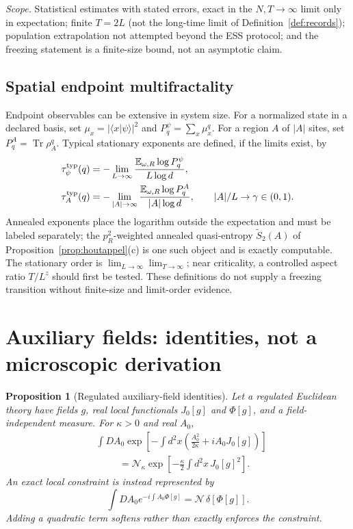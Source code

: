 \documentclass[aps,prx,reprint,superscriptaddress,nobibnotes,longbibliography]{revtex4-2}
\newtheorem{proposition}{Proposition}
\theoremstyle{remark}
\newcommand{\Tr}{\operatorname{Tr}}
\newcommand{\E}{\mathbb E}
\begin{document}
\emph{Scope.}  Statistical estimates with stated errors, exact in the $N,T\to\infty$ limit only in expectation; finite $T=2L$ (not the long-time limit of Definition~\ref{def:records}); population extrapolation not attempted beyond the ESS protocol; and the freezing statement is a finite-size bound, not an asymptotic claim.

\subsection{Spatial endpoint multifractality}

Endpoint observables can be extensive in system size.  For a normalized state in a declared basis, set $\mu_x=|\langle x|\psi\rangle|^2$ and $P_q^\psi=\sum_x\mu_x^q$.  For a region $A$ of $|A|$ sites, set $P_q^A=\Tr\rho_A^q$.  Typical stationary exponents are defined, if the limits exist, by
\begin{align}
 \tau_\psi^{\rm typ}(q)&=-\lim_{L\to\infty}\frac{\E_{\omega,R}\log P_q^\psi}{L\log d},\\
 \tau_A^{\rm typ}(q)&=-\lim_{|A|\to\infty}\frac{\E_{\omega,R}\log P_q^A}{|A|\log d},\qquad |A|/L\to\gamma\in(0,1).
\end{align}
Annealed exponents place the logarithm outside the expectation and must be labeled separately; the $p_R^2$-weighted annealed quasi-entropy $\tilde S_2(A)$ of Proposition~\ref{prop:houtappel}(c) is one such object and is exactly computable.  The stationary order is $\lim_{L\to\infty}\lim_{T\to\infty}$; near criticality, a controlled aspect ratio $T/L^z$ should first be tested.  These definitions do not supply a freezing transition without finite-size and limit-order evidence.

\section{Auxiliary fields: identities, not a microscopic derivation}

\begin{proposition}[Regulated auxiliary-field identities]
\label{thm:aux}
Let a regulated Euclidean theory have fields $g$, real local functionals $J_0[g]$ and $\Phi[g]$, and a field-independent measure.  For $\kappa>0$ and real $A_0$,
\begin{align}
 &\int DA_0\exp\left[-\int d^2x\left(\frac{A_0^2}{2\kappa}+iA_0J_0[g]\right)\right]\nonumber\\
 &\hspace{1cm}=\mathcal N_\kappa\exp\left[-\frac\kappa2\int d^2x\,J_0[g]^2\right].
 \label{eq:HS}
\end{align}
An exact local constraint is instead represented by
\begin{equation}
 \int DA_0e^{-i\int A_0\Phi[g]}=\mathcal N\,\delta[\Phi[g]].
 \label{eq:constraint}
\end{equation}
Adding a quadratic term softens rather than exactly enforces the constraint.
\end{proposition}
\end{document}
